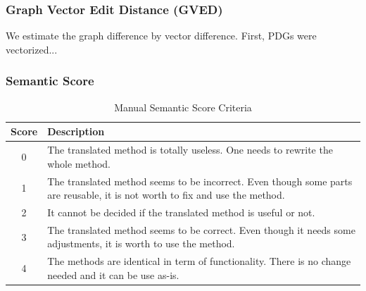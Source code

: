 \subsubsection{\textbf{Graph Vector Edit Distance (GVED)}} We estimate the graph difference by vector difference. First, PDGs were vectorized...
\subsubsection{\textbf{Semantic Score}}
\begin{table}
\caption{Manual Semantic Score Criteria}
\begin{tabular}{|c|p{6.5cm}|}
\hline
Score & Description \\
\hline
0 & The translated method is totally useless. One needs to rewrite the whole method. \\
\hline
1 & The translated method seems to be incorrect. Even though some parts are reusable, it is not worth to fix and use the method. \\
\hline
2 &  It cannot be decided if the translated method is useful or not. \\
\hline
3 & The translated method seems to be correct. Even though it needs some adjustments, it is worth to use the method. \\
\hline
4 & The methods are identical in term of functionality. There is no change needed and it can be use as-is. \\
\hline
\end{tabular}
\label{table:criteria}
\end{table}


